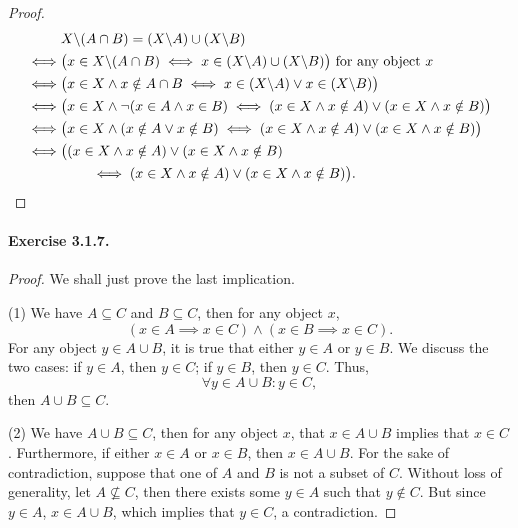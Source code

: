 \begin{enumerate}
\begin{proof}
\begin{align*}
            & X\backslash (A \cap B) = (X\backslash A) \cup (X\backslash B)
            \\\iff& \big(x \in X\backslash (A \cap B) \iff x \in (X\backslash A) \cup (X\backslash B) \big) \text{ for any object $x$}
            \\\iff& \big(x \in X \land x \notin A \cap B \iff x \in (X\backslash A) \lor x \in (X\backslash B) \big)
            \\\iff& \big(x \in X \land \lnot (x \in A \land x \in B) \iff (x \in X \land x \notin A) \lor (x \in X \land x \notin B) \big)
            \\\iff& \big(x \in X \land (x \notin A \lor x \notin B) \iff (x \in X \land x \notin A) \lor (x \in X \land x \notin B) \big)
            \\\iff& \big( (x \in X \land x \notin A) \lor (x \in X \land x \notin B) \\&\qquad\iff (x \in X \land x \notin A) \lor (x \in X \land x \notin B) \big). \qedhere
        \end{align*}
    \end{proof}
\end{enumerate}

\paragraph{Exercise 3.1.7.}
\begin{proof}
    We shall just prove the last implication. 
    
    (1) We have $A\subseteq C$ and $B \subseteq C$, then for any object $x$, \[(x \in A \implies x\in C) \land (x \in B \implies x\in C).\] For any object $y\in A\cup B$, it is true that either $y\in A$ or $y\in B$. We discuss the two cases: if $y\in A$, then $y\in C$; if $y\in B$, then $y\in C$. Thus, \[\forall y \in A \cup B : y \in C,\] then $A \cup B \subseteq C$.

    (2) We have $A \cup B \subseteq C$, then for any object $x$, that $x\in A\cup B$ implies that $x\in C$. Furthermore, if either $x\in A$ or $x\in B$, then $x\in A\cup B$. For the sake of contradiction, suppose that one of $A$ and $B$ is not a subset of $C$. Without loss of generality, let $A \nsubseteq C $, then there exists some $y\in A$ such that $y\notin C$. But since $y\in A$, $x\in A\cup B$, which implies that $y \in C$, a contradiction.
\end{proof}

